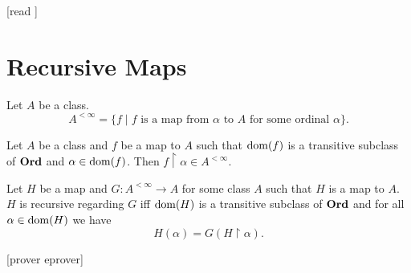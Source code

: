 \documentclass[10pt]{article}
\begin{document}
  \begin{imports}
    \begin{forthel}
      [read ]
    \end{forthel}
  \end{imports}


  \section*{Recursive Maps}

  \begin{forthel}
    \begin{definition}[id=SET_THEORY_04_1955917673267200,printid]
      Let $A$ be a class.
      \[ A^{< \infty} = \{f \mid \text{$f$ is a map from $\alpha$ to $A$ for some ordinal $\alpha$} \}. \]
    \end{definition}
  \end{forthel}

  \begin{forthel}
    \begin{proposition}[id=SET_THEORY_04_7841726894964736,printid]
      Let $A$ be a class and $f$ be a map to $A$ such that $\operatorname{dom}(f)$ is a transitive subclass of $\textbf{Ord}$ and $\alpha \in \operatorname{dom}(f)$.
      Then $f \restriction \alpha \in A^{< \infty}$.
    \end{proposition}
  \end{forthel}

  \begin{forthel}
    \begin{definition}[id=SET_THEORY_04_5597213870784512,printid]
      Let $H$ be a map and $G : A^{< \infty} \to A$ for some class $A$ such that $H$ is a map to $A$.
      $H$ is recursive regarding $G$ iff $\operatorname{dom}(H)$ is a transitive subclass of $\textbf{Ord}$ and for all $\alpha \in \operatorname{dom}(H)$ we have \[ H(\alpha) = G(H \restriction \alpha). \]
    \end{definition}
    [prover eprover]
  \end{forthel}
\end{document}
